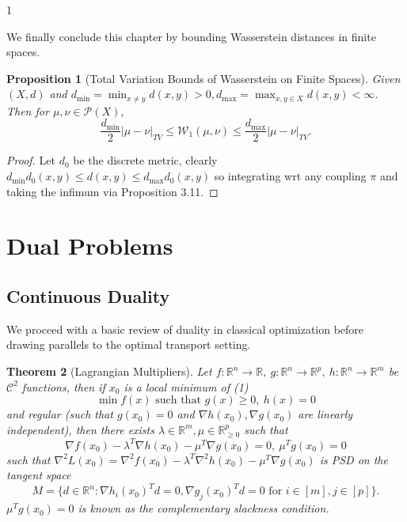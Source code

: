 \documentclass[12pt]{article}
\newtheorem{theorem}{Theorem}[section]
\newtheorem{proposition}[theorem]{Proposition}
\theoremstyle{definition}
\theoremstyle{plain}
\begin{document}
\begin{spacing}{1}
{\bigskip
We finally conclude this chapter by bounding Wasserstein distances in finite spaces.

\begin{proposition}[Total Variation Bounds of Wasserstein on Finite Spaces]
    Given $(X, d)$ and $d_{\min} = \min_{x \neq y}d(x, y) > 0, d_{\max} = \max_{x, y \in X} d(x, y) < \infty$. Then for $\mu, \nu \in \mathcal{P}(X),$
    \[
    \frac{d_{\min}}{2} \lvert \mu - \nu \rvert_{TV} \leq \mathcal{W}_1(\mu, \nu) \leq \frac{d_{\max}}{2}\lvert \mu - \nu \rvert_{TV}.
    \]
\end{proposition}

\begin{proof}
    Let $d_0$ be the discrete metric, clearly $d_{\min} d_0(x, y) \leq d(x, y) \leq d_{\max} d_0(x, y)$ so integrating wrt any coupling $\pi$ and taking the infimum via Proposition 3.11. 
\end{proof}

\newpage
\section{Dual Problems}

\subsection{Continuous Duality}
We proceed with a basic review of duality in classical optimization before drawing parallels to the optimal transport setting.

\begin{theorem}[Lagrangian Multipliers]
    Let $f: \mathbb{R}^n \rightarrow \mathbb{R}, \ g: \mathbb{R}^n \rightarrow \mathbb{R}^p, \ h: \mathbb{R}^n \rightarrow \mathbb{R}^m$ be $\mathcal{C}^2$ functions, then if $x_0$ is a local minimum of (1)
    \[
    \min f(x) \text{ such that } g(x) \geq 0, \ h(x) = 0
    \]
    and regular (such that $g(x_0) = 0$ and $\nabla h(x_0), \nabla g(x_0)$ are linearly independent), then there exists $\lambda \in \mathbb{R}^m, \mu \in \mathbb{R}^p_{\geq 0}$ such that
    \[
    \nabla f(x_0) - \lambda^T \nabla h(x_0) - \mu^T \nabla g(x_0) = 0, \ \mu^T g(x_0) = 0
    \]
    such that $\nabla^2 L(x_0) = \nabla^2 f(x_0) - \lambda^T \nabla^2h(x_0) - \mu^T \nabla g(x_0)$ is PSD on the tangent space 
    \[
    M = \{d \in \mathbb{R}^n: \nabla h_i(x_0)^T d = 0, \nabla g_j(x_0)^Td = 0 \text{ for } i \in [m], j \in [p]\}.
    \]
    $\mu^T g(x_0) = 0$ is known as the complementary slackness condition.
\end{theorem}

}
\end{spacing}
\end{document}
